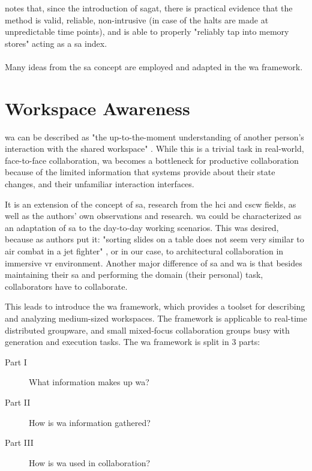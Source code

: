 \cite{endsley_direct_nodate} notes that, since the introduction of \gls{sagat}, there is practical evidence that the method is valid, reliable, non-intrusive (in case of the halts are made at unpredictable time points), and is able to properly "reliably tap into memory stores" acting as a \gls{sa} index. 


\paragraph[Bridge]{}
Many ideas from the \gls{sa} concept are employed and adapted in the \gls{wa} framework.


\section{Workspace Awareness}
\gls{wa} can be described as "the up-to-the-moment understanding of another person’s interaction with the shared workspace" \cite{gutwin_descriptive_2002}. While this is a trivial task in real-world, face-to-face collaboration, \gls{wa} becomes a bottleneck for productive collaboration because of the limited information that systems provide about their state changes, and their unfamiliar interaction interfaces.
 
It is an extension of the concept of \gls{sa}, research from the \gls{hci} and \gls{cscw} fields, as well as the authors' own observations and research. \gls{wa} could be characterized as an adaptation of \gls{sa} to the day-to-day working scenarios. This was desired, because as authors put it: "sorting slides on a table does not seem very similar to air combat in a jet fighter" \cite{gutwin_descriptive_2002}, or in our case, to architectural collaboration in immersive \gls{vr} environment. Another major difference of \gls{sa} and \gls{wa} is that besides maintaining their \gls{sa} and performing the domain (their personal) task, collaborators have to collaborate.

This leads \cite{gutwin_descriptive_2002} to introduce the \gls{wa} framework, which provides a toolset for describing and analyzing medium-sized workspaces. The framework is applicable to real-time distributed groupware, and small mixed-focus collaboration groups busy with generation and execution tasks.
The \gls{wa} framework is split in 3 parts:
\begin{description}
	\item[Part I] What information makes up \gls{wa}?
	\item[Part II] How is \gls{wa} information gathered?
	\item[Part III] How is \gls{wa} used in collaboration? 
\end{description}

